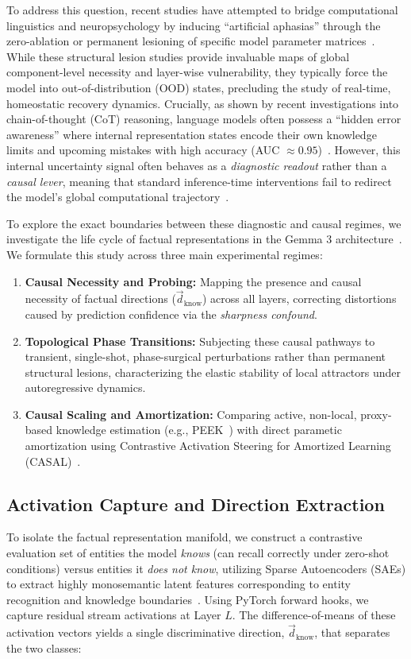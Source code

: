 \documentclass[10pt,journal,onecolumn]{article}
\begin{document}
To address this question, recent studies have attempted to bridge computational linguistics and neuropsychology by inducing ``artificial aphasias'' through the zero-ablation or permanent lesioning of specific model parameter matrices~\cite{roll2026artificial}. While these structural lesion studies provide invaluable maps of global component-level necessity and layer-wise vulnerability, they typically force the model into out-of-distribution (OOD) states, precluding the study of real-time, homeostatic recovery dynamics. Crucially, as shown by recent investigations into chain-of-thought (CoT) reasoning, language models often possess a ``hidden error awareness'' where internal representation states encode their own knowledge limits and upcoming mistakes with high accuracy (AUC $\approx 0.95$)~\cite{yuan2026hidden}. However, this internal uncertainty signal often behaves as a \textit{diagnostic readout} rather than a \textit{causal lever}, meaning that standard inference-time interventions fail to redirect the model's global computational trajectory~\cite{yuan2026hidden}.

To explore the exact boundaries between these diagnostic and causal regimes, we investigate the life cycle of factual representations in the Gemma 3 architecture~\cite{deepmind2026gemma3}. We formulate this study across three main experimental regimes:
\begin{enumerate}
    \item \textbf{Causal Necessity and Probing:} Mapping the presence and causal necessity of factual directions ($\vec{d}_{\text{know}}$) across all layers, correcting distortions caused by prediction confidence via the \textit{sharpness confound}.
    \item \textbf{Topological Phase Transitions:} Subjecting these causal pathways to transient, single-shot, phase-surgical perturbations rather than permanent structural lesions, characterizing the elastic stability of local attractors under autoregressive dynamics.
    \item \textbf{Causal Scaling and Amortization:} Comparing active, non-local, proxy-based knowledge estimation (e.g., PEEK~\cite{sharma2025efficient}) with direct parametic amortization using Contrastive Activation Steering for Amortized Learning (CASAL)~\cite{yang2025hallucination}.
\end{enumerate}

\subsection{Activation Capture and Direction Extraction}
\label{sec:activation_capture}
To isolate the factual representation manifold, we construct a contrastive evaluation set of entities the model \textit{knows} (can recall correctly under zero-shot conditions) versus entities it \textit{does not know}, utilizing Sparse Autoencoders (SAEs) to extract highly monosemantic latent features corresponding to entity recognition and knowledge boundaries~\cite{ferrando2025do}. Using PyTorch forward hooks, we capture residual stream activations at Layer $L$. The difference-of-means of these activation vectors yields a single discriminative direction, $\vec{d}_{\text{know}}$, that separates the two classes:
\end{document}

